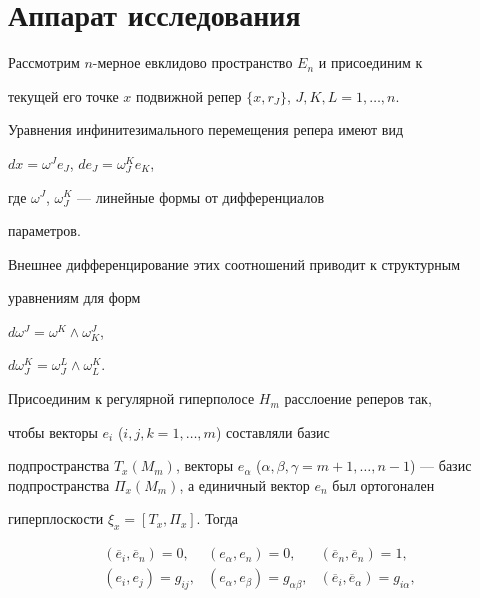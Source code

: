 \section{Аппарат исследования}





Рассмотрим $n$-мерное евклидово пространство $E_n$ и присоединим к


текущей его точке $x$ подвижной репер $\{x, r_{J}\}$, $J, K,L=1,\dotsc, n$.





Уравнения инфинитезимального перемещения репера имеют вид


$dx=\omega^Je_J$, $de_J=\omega^K_Je_K$,


где $\omega^J$, $\omega^K_J$ --- линейные формы от дифференциалов


параметров.





Внешнее дифференцирование этих соотношений приводит к структурным


уравнениям для форм


$d\omega^J=\omega^K\wedge\omega^J_K$,


$d\omega^K_J=\omega^L_J\wedge\omega^K_L$.


Присоединим к регулярной гиперполосе $H_m$ расслоение реперов так,


чтобы векторы $e_i$ ($i, j, k=1,\dotsc, m$) составляли базис


подпространства $T_x(M_m)$, векторы $e_{\alpha}$ ($\alpha, \beta,


\gamma=m+1, \dotsc, n-1$) --- базис подпространства $\Pi


_x(M_m)$, а единичный вектор $e_n$ был ортогонален


гиперплоскости $\xi_x=[T_x, \Pi _x]$. Тогда


\begin{equation}


\label{eq_ch3}


\begin{array}{lll}


\left(\overline{e}_i, \overline{e}_n\right)=0, & \left(e_{\alpha},


e_n\right)=0, & \left(\overline{e}_n, \overline{e}_n\right)=1,\\[2mm]


\left(e_i, e_j\right)=g_{ij}, & \left(e_{\alpha}, e_{\beta}\right)=


g_{\alpha\beta},


& \left(\overline{e}_i, \overline{e}_{\alpha}\right)=g_{i\alpha},


\end{array}


\end{equation}


